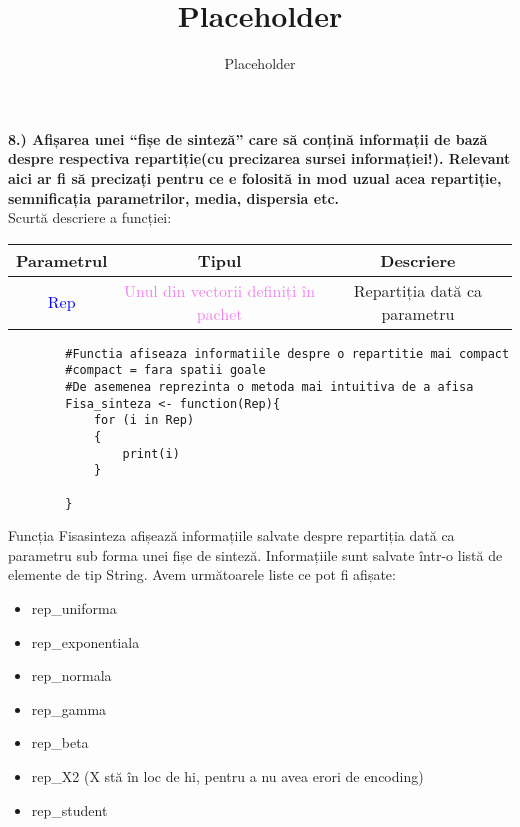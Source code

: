 \documentclass[12pt]{article}
\title{Placeholder}
\author{Placeholder}
\begin{document}
	
	\textbf{8.) Afișarea unei “fișe de sinteză” care să conțină informații de bază despre respectiva
		repartiție(cu precizarea sursei informației!). Relevant aici ar fi să precizați pentru ce e
		folosită in mod uzual acea repartiție, semnificația parametrilor, media, dispersia etc.}\vspace{5mm}\\
\indent Scurtă descriere a funcției: \\
\begin{center}
	\begin{tabular}{|| c | c | c ||}
		\hline
		Parametrul & Tipul & Descriere \\
		\hline
		\textcolor{blue}{Rep}	 & \textcolor{violet}{Unul din vectorii definiți în pachet} & Repartiția dată ca parametru \\
		\hline
	\end{tabular}
\end{center}	
	\begin{lstlisting}
		#Functia afiseaza informatiile despre o repartitie mai compact
		#compact = fara spatii goale
		#De asemenea reprezinta o metoda mai intuitiva de a afisa
		Fisa_sinteza <- function(Rep){
			for (i in Rep)
			{
				print(i)
			}
			
		}
	\end{lstlisting}
	

Funcția Fisa\underline{\hspace{.08in}}sinteza afișează informațiile salvate despre repartiția dată ca parametru sub forma unei fișe de sinteză.\hfill \break
\indent Informațiile sunt salvate într-o listă de elemente de tip String. Avem următoarele liste ce pot fi afișate:
\begin{itemize}
	\item rep\_uniforma
	\item rep\_exponentiala
	\item rep\_normala
	\item rep\_gamma
	\item rep\_beta
	\item rep\_X2 (X stă în loc de hi, pentru a nu avea erori de encoding)
	\item rep\_student
\end{itemize}
	
	
\end{document}
